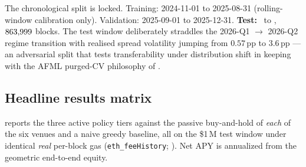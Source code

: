 The chronological split is locked.  Training: 2024-11-01 to
2025-08-31 (rolling-window calibration only).  Validation:
2025-09-01 to 2025-12-31.  \textbf{Test:} \DataStart\ to \DataEnd,
$863{,}999$ blocks.  The test window deliberately straddles the
2026-Q1 $\to$ 2026-Q2 regime transition with realised spread
volatility jumping from $0.57$\,pp to $3.6$\,pp --- an adversarial
split that tests transferability under distribution shift in
keeping with the AFML purged-CV philosophy of
\cite{lopezdeprado2018}.

\subsection{Headline results matrix}
\label{sec:emp-results}

 reports the three active policy tiers against
the passive buy-and-hold of \emph{each} of the six venues and a naive
greedy baseline, all on the \$1\,M test window under identical
\emph{real} per-block gas (\texttt{eth\_feeHistory};
).  Net APY is annualized from the geometric
end-to-end equity.

